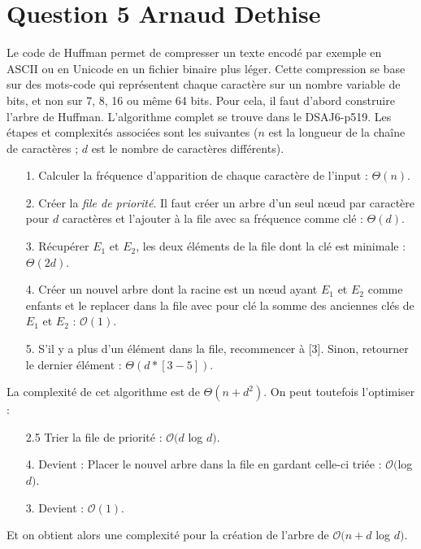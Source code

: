 \documentclass[10pt,a4paper]{article}
\begin{document}
\section*{Question 5 Arnaud Dethise}
Le code de Huffman permet de compresser un texte encodé par exemple en ASCII ou en Unicode en un fichier binaire plus léger. Cette compression se base sur des mots-code qui représentent chaque caractère sur un nombre variable de bits, et non sur 7, 8, 16 ou même 64 bits.
Pour cela, il faut d'abord construire l'arbre de Huffman. L'algorithme complet se trouve dans le DSAJ6-p519. Les étapes et complexités associées sont les suivantes ($n$ est la longueur de la chaîne de caractères ; $d$ est le nombre de caractères différents).
\vspace{0.3cm}
\begin{enumerate}
\item[1.] Calculer la fréquence d'apparition de chaque caractère de l'input : $\Theta(n)$.
\item[2.] Créer la \textit{file de priorité}. Il faut créer un arbre d'un seul nœud par caractère pour $d$ caractères et l'ajouter à la file avec sa fréquence comme clé : $\Theta(d)$.
\item[3.] Récupérer $E_1$ et $E_2$, les deux éléments de la file dont la clé est minimale : $\Theta(2d)$.
\item[4.] Créer un nouvel arbre dont la racine est un nœud ayant $E_1$ et $E_2$ comme enfants et le replacer dans la file avec pour clé la somme des anciennes clés de $E_1$ et $E_2$ : $\mathcal{O}(1)$.
\item[5.] S'il y a plus d'un élément dans la file, recommencer à [3]. Sinon, retourner le dernier élément : $\Theta(d*[3-5])$.
\end{enumerate}
\vspace{0.3cm}
La complexité de cet algorithme est de $\Theta(n + d^2)$. On peut toutefois l'optimiser :
\vspace{0.3cm}
\begin{enumerate}
\item[2.5] Trier la file de priorité : $\mathcal{O}(d $ log $d)$.
\item[4.] Devient : Placer le nouvel arbre dans la file en gardant celle-ci triée : $\mathcal{O}($log $d)$.
\item[3.] Devient : $\mathcal{O}(1)$.
\end{enumerate}
\vspace{0.3cm}
Et on obtient alors une complexité pour la création de l'arbre de $\mathcal{O}(n + d $ log $ d)$.
\end{document}
